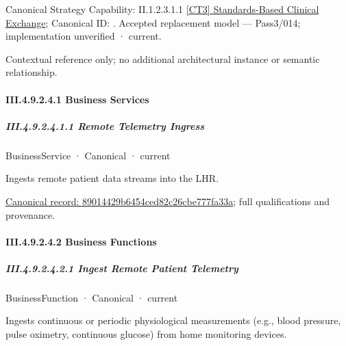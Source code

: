 {\small Canonical Strategy Capability: II.1.2.3.1.1 \hyperref[element:319398b3f4b54bac85b61cb5ecd392b1]{[CT3] Standards-Based Clinical Exchange}; Canonical ID: \texttt{}. Accepted replacement model — Pass3/014; implementation unverified · current.}\par
Contextual reference only; no additional architectural instance or semantic relationship.\par
\paragraph*{III.4.9.2.4.1 Business Services}
\label{navigation:III.4.9.2.4.1}

\subparagraph*{III.4.9.2.4.1.1 Remote Telemetry Ingress}
\label{navigation:III.4.9.2.4.1.1}

\label{element:89014429b6454ced82c26cbe777fa33a}
{\small BusinessService · Canonical · current}\par

Ingests remote patient data streams into the LHR.


{\footnotesize \href{../../../../../../../continuum/business/business-service/89014429b6454ced82c26cbe777fa33a.md}{Canonical record: 89014429b6454ced82c26cbe777fa33a}; full qualifications and provenance.}\par
\paragraph*{III.4.9.2.4.2 Business Functions}
\label{navigation:III.4.9.2.4.2}

\subparagraph*{III.4.9.2.4.2.1 Ingest Remote Patient Telemetry}
\label{navigation:III.4.9.2.4.2.1}

\label{element:cb03c3040e1c4a4a9fdadb2502113014}
{\small BusinessFunction · Canonical · current}\par

Ingests continuous or periodic physiological measurements (e.g., blood pressure, pulse oximetry, continuous glucose) from home monitoring devices.


